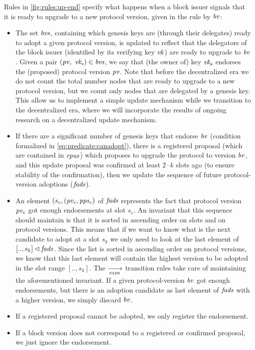 Rules in \cref{fig:rules:up-end} specify what happens when a block issuer
signals that it is ready to upgrade to a new protocol version, given in the
rule by $\mathit{bv}$:
\begin{itemize}
\item The set $\mathit{bvs}$, containing which genesis keys are (through their
  delegates) ready to adopt a given protocol version, is updated to reflect
  that the delegators of the block issuer (identified by its verifying key
  $\mathit{vk}$) are ready to upgrade to $\mathit{bv}$. Given a pair
  $(\mathit{pv}, ~\mathit{vk_s}) \in \mathit{bvs}$, we say that (the owner of) key
  $\mathit{vk_s}$ endorses the (proposed) protocol version $\mathit{pv}$.
  Note that before the decentralized era we do not count the total number nodes
  that are ready to upgrade to a new protocol version, but we count only nodes
  that are delegated by a genesis key. This allow us to implement a simple
  update mechanism while we transition to the decentralized era, where we will
  incorporate the results of ongoing research on a decentralized update
  mechanism.
\item If there are a significant number of genesis keys that endorse $\mathit{bv}$
  (condition formalized in \cref{eq:predicate:canadopt}), there is a registered
  proposal (which are contained in $\mathit{rpus}$) which proposes to upgrade the
  protocol to version $\mathit{bv}$, and this update proposal was confirmed at
  least $2 \cdot k$ slots ago (to ensure stability of the confirmation), then
  we update the sequence of future protocol-version adoptions ($\mathit{fads}$).
\item An element $(s_c, (\mathit{pv_c}, \mathit{pps_c})$ of $\mathit{fads}$ represents
  the fact that protocol version $\mathit{pv_c}$ got enough endorsements at slot
  $s_c$. An invariant that this sequence should maintain is that it is sorted
  in ascending order on slots and on protocol versions. This means that if we
  want to know what is the next candidate to adopt at a slot $s_k$ we only need
  to look at the last element of $[.., s_k] \lhd \mathit{fads}$. Since the
  list is sorted in ascending order on protocol versions, we know that this
  last element will contain the highest version to be adopted in the slot range
  $[.., s_k]$. The $\trans{fads}{}$ transition rules take care of maintaining
  the aforementioned invariant. If a given protocol-version $\mathit{bv}$ got
  enough endorsements, but there is an adoption candidate as last element of
  $\mathit{fads}$ with a higher version, we simply discard $\mathit{bv}$.
\item If a registered proposal cannot be adopted, we only register the
  endorsement.
\item If a block version does not correspond to a registered or confirmed
  proposal, we just ignore the endorsement.
\end{itemize}


